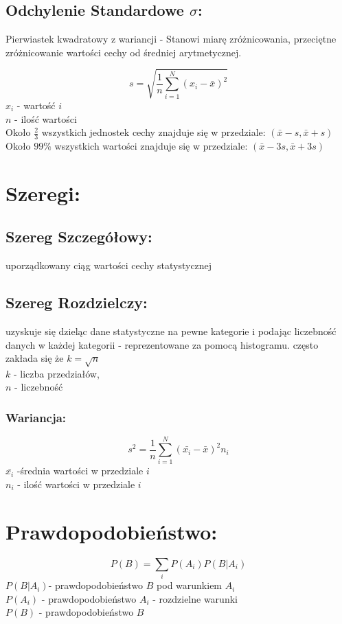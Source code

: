 \documentclass[fleqn,a4paper]{article}
\begin{document}
\subsection{Odchylenie Standardowe \texorpdfstring{\(\sigma\)}{s}:}
Pierwiastek kwadratowy z wariancji - Stanowi miarę zróżnicowania, przeciętne zróżnicowanie wartości cechy od średniej arytmetycznej.

\[s = \sqrt{\frac{1}{n}\sum_{i=1}^N(x_i-\bar{x})^2}\]
$x_i$ - wartość $i$\\
$n$ - ilość wartości \\
Około $\frac{2}{3}$ wszystkich jednostek cechy znajduje się w przedziale: $(\bar{x}-s,\bar{x}+s)$\\
Około $99\%$ wszystkich wartości znajduje się w przedziale:  $(\bar{x}-3s,\bar{x}+3s)$

\pagebreak

\section{Szeregi:}
\subsection{Szereg Szczegółowy:}
uporządkowany ciąg wartości cechy statystycznej

\subsection{Szereg Rozdzielczy:}
uzyskuje się dzieląc dane statystyczne na pewne kategorie i podając liczebność danych w każdej kategorii - reprezentowane za pomocą histogramu.
często zakłada się że $k=\sqrt{n}$\\ $k$ - liczba przedziałów,\\ $n$ - liczebność 
\subsubsection{Wariancja:}
\[s^2 = \frac{1}{n}\sum_{i=1}^N(\bar{x_i}-\bar{x})^2n_i\]
$\bar{x_i}$ -średnia wartości w przedziale $i$\\
$n_i$ - ilość wartości w przedziale $i$

\pagebreak
\section{Prawdopodobieństwo:}
\[P(B) = \sum_i{P(A_i)P(B|A_i)}\]
$P(B|A_i)$- prawdopodobieństwo $B$ pod warunkiem $A_i$\\
$P(A_i)$ - prawdopodobieństwo $A_i$ - rozdzielne warunki\\
$P(B)$ - prawdopodobieństwo $B$
\end{document}
